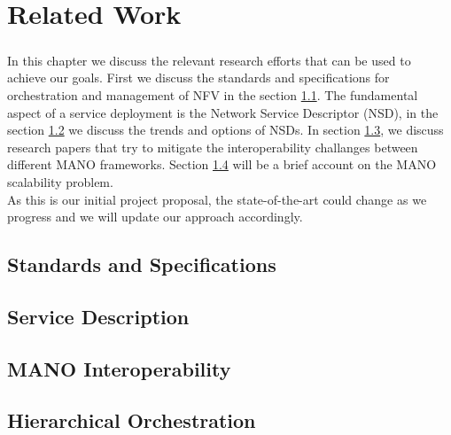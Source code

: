 \chapter{Related Work}
\label{ch:Related Work}

\paragraph{}
In this chapter we discuss the relevant research efforts that can be used to achieve our goals. First we discuss the standards and specifications for orchestration and management of NFV in the section \ref{standSpecs}. The fundamental aspect of a service deployment is the Network Service Descriptor (NSD), in the section \ref{serviceDescription} we discuss the trends and options of NSDs. In section \ref{interopmano}, we discuss research papers that try to mitigate the interoperability challanges between different MANO frameworks. Section \ref{manoscale} will be a brief account on the MANO scalability problem.\\

As this is our initial project proposal, the state-of-the-art could change as we progress and we will update our approach accordingly.


\section{Standards and Specifications}
\label{standSpecs}

\cite{rotsos_network_2017}
\cite{de_sousa_network_2018}
\cite{yong_li_software-defined_2015}

\section{Service Description}
\label{serviceDescription}

\cite{garay_service_2016}

\section{MANO Interoperability}
\label{interopmano}


\section{Hierarchical Orchestration }
\label{manoscale}

